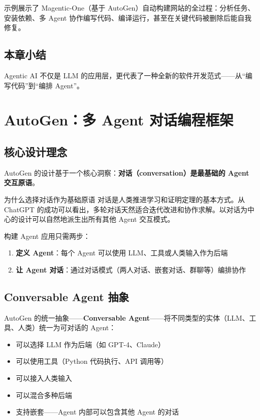 \documentclass[a4paper]{article}
\begin{document}
示例展示了 Magentic-One（基于 AutoGen）自动构建网站的全过程：分析任务、安装依赖、多 Agent 协作编写代码、编译运行，甚至在关键代码被删除后能自我修复。

\subsection{本章小结}

Agentic AI 不仅是 LLM 的应用层，更代表了一种全新的软件开发范式——从``编写代码''到``编排 Agent''。

\section{AutoGen：多 Agent 对话编程框架}

\subsection{核心设计理念}

AutoGen 的设计基于一个核心洞察：\textbf{对话（conversation）是最基础的 Agent 交互原语}。

\begin{knowledgebox}{为什么选择对话作为基础原语}
对话是人类推进学习和证明定理的基本方式。从 ChatGPT 的成功可以看出，多轮对话天然适合迭代改进和协作求解。以对话为中心的设计可以自然地派生出所有其他 Agent 交互模式。
\end{knowledgebox}

构建 Agent 应用只需两步：
\begin{enumerate}
    \item \textbf{定义 Agent}：每个 Agent 可以使用 LLM、工具或人类输入作为后端
    \item \textbf{让 Agent 对话}：通过对话模式（两人对话、嵌套对话、群聊等）编排协作
\end{enumerate}

\subsection{Conversable Agent 抽象}

AutoGen 的统一抽象——\textbf{Conversable Agent}——将不同类型的实体（LLM、工具、人类）统一为可对话的 Agent：
\begin{itemize}
    \item 可以选择 LLM 作为后端（如 GPT-4、Claude）
    \item 可以使用工具（Python 代码执行、API 调用等）
    \item 可以接入人类输入
    \item 可以混合多种后端
    \item 支持嵌套——Agent 内部可以包含其他 Agent 的对话
\end{itemize}
\end{document}
